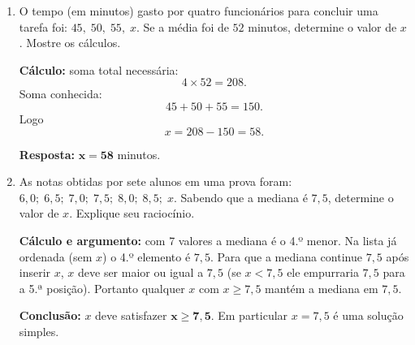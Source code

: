 \documentclass[11pt]{article}
\begin{document}
\begin{enumerate}
\textbf{Resposta:} \(\mathbf{x = 1}\).

\bigskip

\item O tempo (em minutos) gasto por quatro funcionários para concluir uma tarefa foi: $45,\;50,\;55,\;x$.  
Se a média foi de $52$ minutos, determine o valor de $x$. Mostre os cálculos.

\textbf{Cálculo:} soma total necessária:
\[
4 \times 52 = 208.
\]
Soma conhecida:
\[
45 + 50 + 55 = 150.
\]
Logo
\[
x = 208 - 150 = 58.
\]

\textbf{Resposta:} \(\mathbf{x = 58}\) minutos.

\bigskip

\item As notas obtidas por sete alunos em uma prova foram: $6{,}0;\;6{,}5;\;7{,}0;\;7{,}5;\;8{,}0;\;8{,}5;\;x$.  
Sabendo que a mediana é $7{,}5$, determine o valor de $x$. Explique seu raciocínio.

\textbf{Cálculo e argumento:} com 7 valores a mediana é o 4.º menor. Na lista já ordenada (sem \(x\)) o 4.º elemento é \(7{,}5\). Para que a mediana continue \(7{,}5\) após inserir \(x\), \(x\) deve ser maior ou igual a \(7{,}5\) (se \(x<7{,}5\) ele empurraria \(7{,}5\) para a 5.ª posição). Portanto qualquer \(x\) com \(x \ge 7{,}5\) mantém a mediana em \(7{,}5\).  

\textbf{Conclusão:} \(x\) deve satisfazer \(\mathbf{x \ge 7{,}5}\). Em particular \(x=7{,}5\) é uma solução simples.

\end{enumerate}
\end{document}
